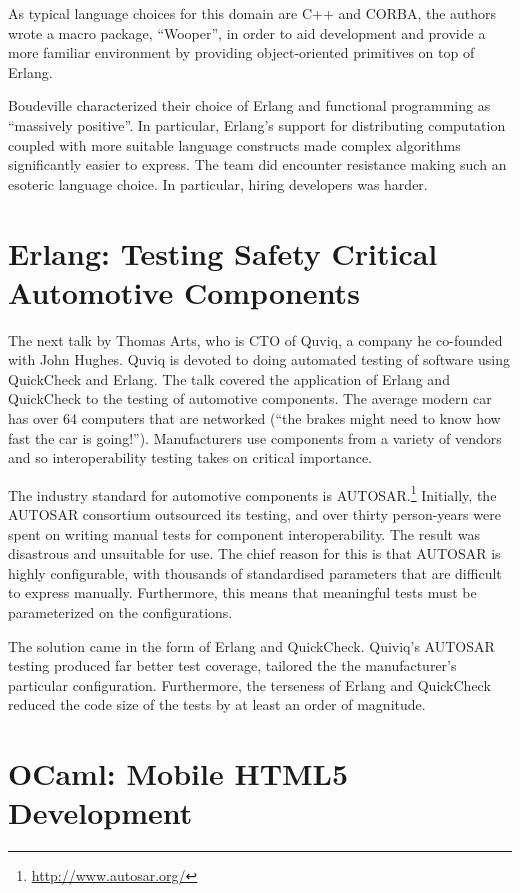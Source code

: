 \documentclass{jfp1}
\begin{document}
As typical language choices for this domain are C++ and CORBA, the authors
wrote a macro package, ``Wooper'', in order to aid development and provide a
more familiar environment by providing object-oriented primitives on top of
Erlang.

Boudeville characterized their choice of Erlang and functional programming as
``massively positive''.  In particular, Erlang's support for distributing
computation coupled with more suitable language constructs made complex
algorithms significantly easier to express.  The team did encounter resistance
making such an esoteric language choice.  In particular, hiring developers was
harder.

\section{Erlang: Testing Safety Critical Automotive Components}

The next talk by Thomas Arts, who is CTO of Quviq, a company he co-founded with
John Hughes. Quviq is devoted to doing automated testing of software using
QuickCheck and Erlang.  The talk covered the application of Erlang and
QuickCheck to the testing of automotive components.  The average modern car has
over 64 computers that are networked (``the brakes might need to know how fast
the car is going!'').  Manufacturers use components from a variety of vendors
and so interoperability testing takes on critical importance.

The industry standard for automotive components is
AUTOSAR.\footnote{\url{http://www.autosar.org/}} Initially, the AUTOSAR
consortium outsourced its testing, and over thirty person-years were spent on
writing manual tests for component interoperability.  The result was disastrous
and unsuitable for use.  The chief reason for this is that AUTOSAR is highly
configurable, with thousands of standardised parameters that are difficult to
express manually.  Furthermore, this means that meaningful tests must be
parameterized on the configurations.

The solution came in the form of Erlang and QuickCheck.  Quiviq's AUTOSAR
testing produced far better test coverage, tailored the the manufacturer's
particular configuration.  Furthermore, the terseness of Erlang and QuickCheck
reduced the code size of the tests by at least an order of magnitude.

\section{OCaml: Mobile HTML5 Development}
\end{document}
